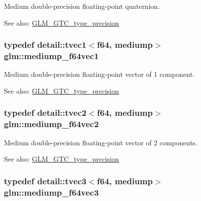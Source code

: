 Medium double-precision floating-point quaternion. \begin{Desc}
\item[See also:]\hyperlink{group__gtc__type__precision}{GLM\_\-GTC\_\-type\_\-precision} \end{Desc}
\hypertarget{group__gtc__type__precision_g1e3bbbd9ce5e215c4ba0980264b2711d}{
\subsubsection[mediump\_\-f64vec1]{\setlength{\rightskip}{0pt plus 5cm}typedef detail::tvec1$<$f64, mediump$>$ {\bf glm::mediump\_\-f64vec1}}}
\label{group__gtc__type__precision_g1e3bbbd9ce5e215c4ba0980264b2711d}


Medium double-precision floating-point vector of 1 component. \begin{Desc}
\item[See also:]\hyperlink{group__gtc__type__precision}{GLM\_\-GTC\_\-type\_\-precision} \end{Desc}
\hypertarget{group__gtc__type__precision_g892891863b8e50195e3e48077a329335}{
\subsubsection[mediump\_\-f64vec2]{\setlength{\rightskip}{0pt plus 5cm}typedef detail::tvec2$<$f64, mediump$>$ {\bf glm::mediump\_\-f64vec2}}}
\label{group__gtc__type__precision_g892891863b8e50195e3e48077a329335}


Medium double-precision floating-point vector of 2 components. \begin{Desc}
\item[See also:]\hyperlink{group__gtc__type__precision}{GLM\_\-GTC\_\-type\_\-precision} \end{Desc}
\hypertarget{group__gtc__type__precision_ge2832f9acbf0cc1071fcf93336db6e0c}{
\subsubsection[mediump\_\-f64vec3]{\setlength{\rightskip}{0pt plus 5cm}typedef detail::tvec3$<$f64, mediump$>$ {\bf glm::mediump\_\-f64vec3}}}
\label{group__gtc__type__precision_ge2832f9acbf0cc1071fcf93336db6e0c}


